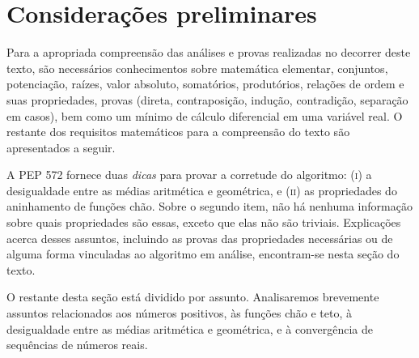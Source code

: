 \section*{Considerações preliminares}

Para a apropriada compreensão
das análises e provas realizadas no decorrer deste texto,
são necessários conhecimentos sobre matemática elementar, conjuntos,
potenciação, raízes, valor absoluto, somatórios, produtórios,
relações de ordem e suas propriedades,
provas (direta, contraposição, indução, contradição,
        separação em casos),
bem como um mínimo de cálculo diferencial em uma variável real.
O restante dos requisitos matemáticos para a compreensão do texto
são apresentados a seguir.

A PEP 572 fornece duas \emph{dicas}
para provar a corretude do algoritmo:
\textsc{(i)} a desigualdade entre as médias aritmética e geométrica,
e \textsc{(ii)} as propriedades do aninhamento de funções chão.
Sobre o segundo item,
não há nenhuma informação sobre quais propriedades são essas,
exceto que elas não são triviais.
Explicações acerca desses assuntos,
incluindo as provas das propriedades necessárias
ou de alguma forma vinculadas ao algoritmo em análise,
encontram-se nesta seção do texto.

O restante desta seção está dividido por assunto.
Analisaremos brevemente assuntos relacionados
aos números positivos,
às funções chão e teto,
à desigualdade entre as médias aritmética e geométrica,
e à convergência de sequências de números reais.






